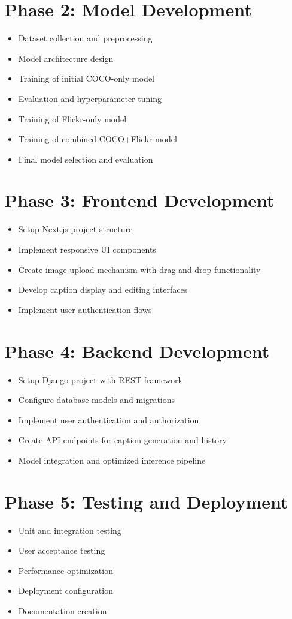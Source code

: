 \documentclass[12pt,a4paper]{report}
\begin{document}
\section{Phase 2: Model Development}
\begin{itemize}
    \item Dataset collection and preprocessing
    \item Model architecture design
    \item Training of initial COCO-only model
    \item Evaluation and hyperparameter tuning
    \item Training of Flickr-only model
    \item Training of combined COCO+Flickr model
    \item Final model selection and evaluation
\end{itemize}

\section{Phase 3: Frontend Development}
\begin{itemize}
    \item Setup Next.js project structure
    \item Implement responsive UI components
    \item Create image upload mechanism with drag-and-drop functionality
    \item Develop caption display and editing interfaces
    \item Implement user authentication flows
\end{itemize}

\section{Phase 4: Backend Development}
\begin{itemize}
    \item Setup Django project with REST framework
    \item Configure database models and migrations
    \item Implement user authentication and authorization
    \item Create API endpoints for caption generation and history
    \item Model integration and optimized inference pipeline
\end{itemize}

\section{Phase 5: Testing and Deployment}
\begin{itemize}
    \item Unit and integration testing
    \item User acceptance testing
    \item Performance optimization
    \item Deployment configuration
    \item Documentation creation
\end{itemize}
\end{document}
